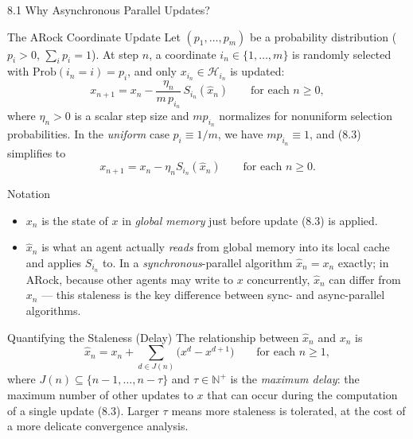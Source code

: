 \documentclass[aspectratio=169,10pt]{beamer}
\newcommand{\Hsp}{\mathcal H}
\begin{document}
\begin{frame}[allowframebreaks]{8.1 Why Asynchronous Parallel Updates?}
\begin{block}{The ARock Coordinate Update}
Let $(p_1,\ldots,p_m)$ be a probability distribution ($p_i>0$, $\sum_i p_i=1$). At step $n$, a coordinate $i_n\in\{1,\ldots,m\}$ is randomly selected with $\mathrm{Prob}(i_n=i)=p_i$, and only $x_{i_n}\in\Hsp_{i_n}$ is updated:
\[
  x_{n+1} = x_n - \frac{\eta_n}{m\,p_{i_n}}\, S_{i_n}(\hat x_n) \qquad \text{for each } n\ge 0, \tag{8.3}
\]
where $\eta_n>0$ is a scalar step size and $mp_{i_n}$ normalizes for nonuniform selection probabilities. In the \emph{uniform} case $p_i\equiv 1/m$, we have $mp_{i_n}\equiv 1$, and (8.3) simplifies to
\[
  x_{n+1} = x_n - \eta_n S_{i_n}(\hat x_n) \qquad \text{for each } n\ge 0. \tag{8.4}
\]
\end{block}

\begin{block}{Notation}
\begin{itemize}
  \item $x_n$ is the state of $x$ in \emph{global memory} just before update (8.3) is applied.
  \item $\hat x_n$ is what an agent actually \emph{reads} from global memory into its local cache and applies $S_{i_n}$ to. In a \emph{synchronous}-parallel algorithm $\hat x_n = x_n$ exactly; in ARock, because other agents may write to $x$ concurrently, $\hat x_n$ can differ from $x_n$ --- this staleness is the key difference between sync- and async-parallel algorithms.
\end{itemize}
\end{block}

\begin{block}{Quantifying the Staleness (Delay)}
The relationship between $\hat x_n$ and $x_n$ is
\[
  \hat x_n = x_n + \sum_{d\in J(n)} \bigl(x^d - x^{d+1}\bigr) \qquad \text{for each } n\ge 1, \tag{8.5}
\]
where $J(n)\subseteq\{n-1,\ldots,n-\tau\}$ and $\tau\in\mathbb N^+$ is the \emph{maximum delay}: the maximum number of other updates to $x$ that can occur during the computation of a single update (8.3). Larger $\tau$ means more staleness is tolerated, at the cost of a more delicate convergence analysis.
\end{block}

\end{frame}
\end{document}
